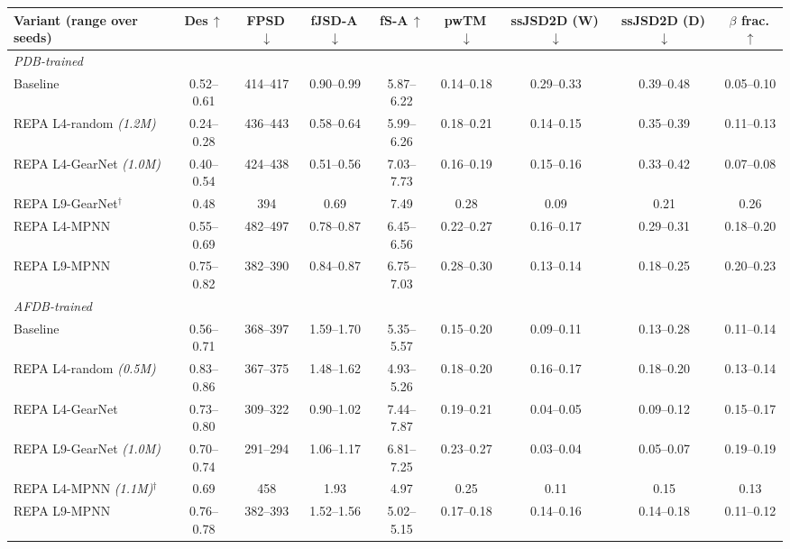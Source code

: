 \begin{tabular}{lcccccccc}
\toprule
\textbf{Variant (range over seeds)} & Des\,$\uparrow$ & FPSD\,$\downarrow$ & fJSD-A\,$\downarrow$ & fS-A\,$\uparrow$ & pwTM\,$\downarrow$ & ssJSD2D (W)\,$\downarrow$ & ssJSD2D (D)\,$\downarrow$ & $\beta$ frac.\,$\uparrow$ \\
\midrule
\multicolumn{9}{l}{\textit{PDB-trained}}\\
Baseline & 0.52--0.61 & 414--417 & 0.90--0.99 & 5.87--6.22 & 0.14--0.18 & 0.29--0.33 & 0.39--0.48 & 0.05--0.10 \\
REPA L4-random \textit{\scriptsize(1.2M)} & 0.24--0.28 & 436--443 & 0.58--0.64 & 5.99--6.26 & 0.18--0.21 & 0.14--0.15 & 0.35--0.39 & 0.11--0.13 \\
REPA L4-GearNet \textit{\scriptsize(1.0M)} & 0.40--0.54 & 424--438 & 0.51--0.56 & 7.03--7.73 & 0.16--0.19 & 0.15--0.16 & 0.33--0.42 & 0.07--0.08 \\
REPA L9-GearNet$^{\dagger}$ & 0.48 & 394 & 0.69 & 7.49 & 0.28 & 0.09 & 0.21 & 0.26 \\
REPA L4-MPNN & 0.55--0.69 & 482--497 & 0.78--0.87 & 6.45--6.56 & 0.22--0.27 & 0.16--0.17 & 0.29--0.31 & 0.18--0.20 \\
REPA L9-MPNN & 0.75--0.82 & 382--390 & 0.84--0.87 & 6.75--7.03 & 0.28--0.30 & 0.13--0.14 & 0.18--0.25 & 0.20--0.23 \\
\midrule
\multicolumn{9}{l}{\textit{AFDB-trained}}\\
Baseline & 0.56--0.71 & 368--397 & 1.59--1.70 & 5.35--5.57 & 0.15--0.20 & 0.09--0.11 & 0.13--0.28 & 0.11--0.14 \\
REPA L4-random \textit{\scriptsize(0.5M)} & 0.83--0.86 & 367--375 & 1.48--1.62 & 4.93--5.26 & 0.18--0.20 & 0.16--0.17 & 0.18--0.20 & 0.13--0.14 \\
REPA L4-GearNet & 0.73--0.80 & 309--322 & 0.90--1.02 & 7.44--7.87 & 0.19--0.21 & 0.04--0.05 & 0.09--0.12 & 0.15--0.17 \\
REPA L9-GearNet \textit{\scriptsize(1.0M)} & 0.70--0.74 & 291--294 & 1.06--1.17 & 6.81--7.25 & 0.23--0.27 & 0.03--0.04 & 0.05--0.07 & 0.19--0.19 \\
REPA L4-MPNN \textit{\scriptsize(1.1M)}$^{\dagger}$ & 0.69 & 458 & 1.93 & 4.97 & 0.25 & 0.11 & 0.15 & 0.13 \\
REPA L9-MPNN & 0.76--0.78 & 382--393 & 1.52--1.56 & 5.02--5.15 & 0.17--0.18 & 0.14--0.16 & 0.14--0.18 & 0.11--0.12 \\
\bottomrule
\end{tabular}
